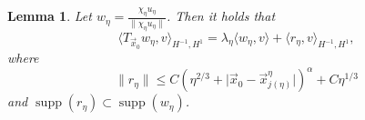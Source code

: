 \documentclass[a4paper,reqno]{amsart}
\numberwithin{equation}{section}
\numberwithin{equation}{section}		%
\numberwithin{figure}{section}			%
\numberwithin{table}{section}				%
\newtheorem{lemma}[theorem]{Lemma}
\theoremstyle{definition}
\newcommand{\<}{\ensuremath \leq}
\renewcommand{\>}{\ensuremath \geq}
\begin{document}
\begin{lemma}\label{lem:BoundaryPseudo}
    Let $w_\eta = \frac{\chi_\eta u_\eta}{\lVert \chi_\eta u_\eta\rVert}$. Then it holds that
    \begin{equation}
        \langle T_{\vec{x}_0}w_\eta,v\rangle_{H^{-1},H^1} = \lambda_\eta\langle w_\eta,v\rangle + \langle r_\eta,v\rangle_{H^{-1},H^1},
    \end{equation}
    where $$\lVert r_\eta\rVert\leq C(\eta^{2/3} + \lvert \vec{x}_0 - \vec{x}_{j(\eta)}^\eta\rvert)^\alpha + C\eta^{1/3}$$ and $\operatorname{supp}(r_\eta)\subset \operatorname{supp}(w_\eta)$.
\end{lemma}
\end{document}
